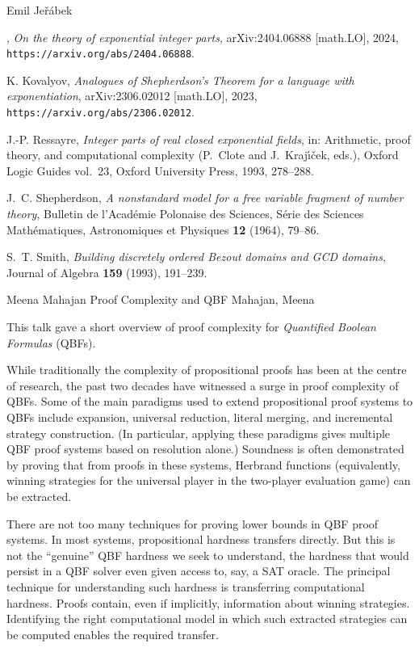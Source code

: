 \documentclass[report]{owrart}
\begin{document}
\begin{report}
\begin{talk}{Emil Je\v r\'abek}
\begin{thebibliography}{9}
  \bysame, \emph{On the theory of exponential integer parts}, {arXiv:2404.06888
    [math.LO]}, 2024, \texttt{https://arxiv.org/abs/2404.06888}.
  
  K. Kovalyov, \emph{Analogues of Shepherdson's Theorem for a
    language with exponentiation}, {arXiv:2306.02012 [math.LO]}, 2023,
    \texttt{https://arxiv.org/abs/2306.02012}.
  
  J.-P. Ressayre, \emph{Integer parts of real closed exponential fields},
    in: Arithmetic, proof theory, and computational complexity (P.~Clote and
    J.~Kraj\'\i\v cek, eds.), Oxford Logic Guides vol.~23, Oxford University
    Press, 1993, 278--288.
  
  J.~C. Shepherdson, \emph{A nonstandard model for a free variable fragment of
    number theory}, Bul\-le\-tin de l'Aca\-d{\'e}\-mie Po\-lo\-naise des
    \hbox{Sciences}, S{\'e}\-rie des \hbox{Sciences} Ma\-th{\'e}\-ma\-tiques,
    As\-tro\-no\-miques et Phy\-siques \textbf{12} (1964), 79--86.
  
  S.~T. Smith, \emph{Building discretely ordered Bezout domains and GCD
    domains}, Journal of Algebra \textbf{159} (1993), 191--239.
  \end{thebibliography}
  
\end{talk}


\begin{talk}{Meena Mahajan}
  {Proof Complexity and QBF}
  {Mahajan, Meena}

  This talk gave a short overview of proof complexity for {\em
  Quantified Boolean Formulas} (QBFs).

While traditionally the complexity of propositional proofs has been at
the centre of research, the past two decades have witnessed a surge in
proof complexity of QBFs.  Some of the main paradigms used to extend
propositional proof systems to QBFs include expansion, universal
reduction, literal merging, and incremental strategy construction.
(In particular, applying these paradigms gives multiple QBF proof
systems based on resolution alone.) Soundness is often demonstrated by
proving that from proofs in these systems, Herbrand functions
(equivalently, winning strategies for the universal player in the
two-player evaluation game) can be extracted.

There are not too many techniques for proving lower bounds in QBF
proof systems. In most systems, propositional hardness transfers
directly. But this is not the ``genuine'' QBF hardness we seek to
understand, the hardness that would persist in a QBF solver even given
access to, say, a SAT oracle. The principal technique for
understanding such hardness is transferring computational
hardness. Proofs contain, even if implicitly, information about
winning strategies. Identifying the right computational model in which
such extracted strategies can be computed enables the required
transfer.


\end{talk}
\end{report}
\end{document}
